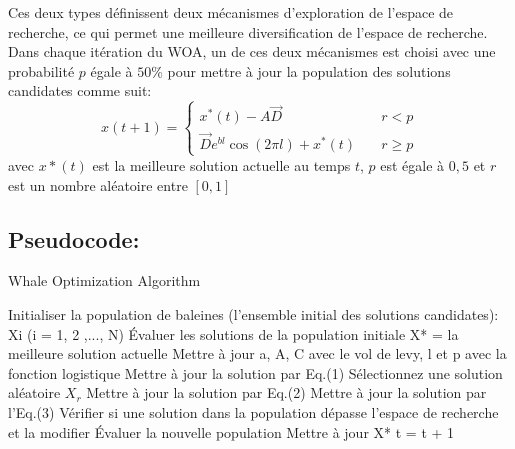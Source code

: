 \documentclass[12pt]{article}
\begin{document}
Ces deux types définissent deux mécanismes d’exploration de l’espace de recherche, ce qui permet une meilleure diversification de l’espace de recherche.
Dans chaque itération du WOA, un de ces deux mécanismes est choisi avec une probabilité \(p\) égale à \(50\%\) pour mettre à jour la population des solutions candidates comme suit:
\[ x(t+1) =
  \begin{cases}
    x^*(t) - A\vec{D}       & \quad r < p\\
    \vec{D} e^{bl} \cos (2\pi l) + x^*(t)  & \quad r \geq p
  \end{cases}
\]
avec \(x*(t)\) est la meilleure solution actuelle au temps \(t\), \(p\) est égale à \(0,5\) et \(r\) est un nombre aléatoire entre \([0, 1]\)

\subsection{Pseudocode:}
\begin{algorithm}[H]
    \caption{Whale Optimization Algorithm}
    \begin{algorithmic}
        \STATE Initialiser la population de baleines (l'ensemble initial des solutions candidates): Xi (i = 1, 2 ,..., N)\;
        \STATE Évaluer les solutions de la population initiale\;
        \STATE X* = la meilleure solution actuelle\;
                \STATE Mettre à jour a, A, C avec le vol de levy, l et p avec la fonction logistique\;
                        \STATE Mettre à jour la solution par Eq.(1)\;
                    \ELSE
                        \STATE Sélectionnez une solution aléatoire \(X_r\)\;
                        \STATE Mettre à jour la solution par Eq.(2)\;
                    \ENDIF
                \ELSE 
                    \STATE Mettre à jour la solution par l'Eq.(3)\;
                \ENDIF
            \ENDFOR
            \STATE Vérifier si une solution dans la population dépasse l'espace de recherche et la modifier\;
            \STATE Évaluer la nouvelle population\;
            \STATE Mettre à jour X* \;
            \STATE t = t + 1\;
        \ENDWHILE
    \end{algorithmic}
\end{algorithm}
\end{document}

